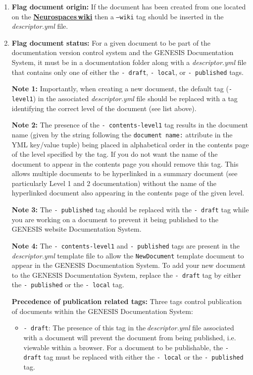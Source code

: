 \documentclass[12pt]{article}
\begin{document}
\begin{enumerate}
\begin{enumerate}
\item {\bf Flag document origin:} If the document has been created from one located on the \href{http://code.google.com/p/neurospaces/w/list}{\bf Neurospaces\,wiki} then a {\tt --wiki} tag should be inserted in the {\it descriptor.yml} file.

\item {\bf Flag document status:} For a given document to be part of the documentation version control system and the GENESIS Documentation System, it must be in a documentation folder along with a {\it descriptor.yml} file that contains only one of either the {\tt -\,draft}, {\tt -\,local}, or {\tt -\,published} tags.

{\bf Note 1:} Importantly, when creating a new document, the default tag ({\tt -\,level1}) in the associated {\it descriptor.yml} file should be replaced with a tag identifying the correct level of the document (see list above).

{\bf Note 2:} The presence of the {\tt -\,contents-level1} tag results in the document name (given by the string following the {\tt document name:} attribute in the YML key/value tuple) being placed in alphabetical order in the contents page of the level specified by the tag. If you do not want the name of the document to appear in the contents page you should remove this tag. This allows multiple documents to be hyperlinked in a summary document (see particularly Level 1 and 2 documentation) without the name of the hyperlinked document also appearing in the contents page of the given level.

{\bf Note 3:} The {\tt-\,published} tag should be replaced with the {\tt -\,draft} tag  while you are working on a document to prevent it being published to the GENESIS website Documentation System. 

{\bf Note 4:} The {\tt -\,contents-level1} and {\tt-\,published} tags are present in the {\it descriptor.yml} template file to allow the {\tt NewDocument} template document to appear in the GENESIS Documentation System. To add your new document to the GENESIS Documentation System, replace the {\tt -\,draft} tag by either the {\tt -\,published} or the {\tt -\,local} tag.  

{\bf Precedence of publication related tags:} Three tags control publication of documents within the GENESIS Documentation System:
\begin{itemize}
	\item[]{\tt -\,draft}: The presence of this tag in the\,{\it descriptor.yml} file associated with a document will prevent the document 
	from being published,  i.e. viewable within a browser. For a document to be publishable, the {\tt -\,draft} tag must be replaced 
	with either the {\tt -\,local} or the {\tt -\,published} tag.
	

\end{itemize}
\end{enumerate}
\end{enumerate}
\end{document}
